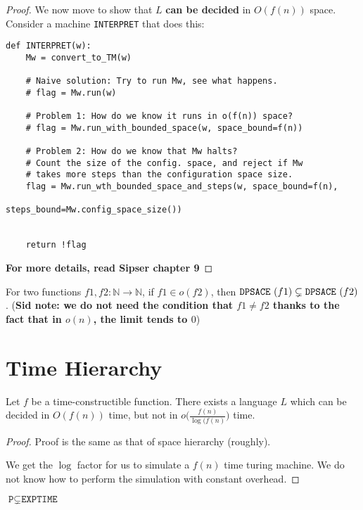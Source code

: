 \begin{proof}
We now move to show that $L$ \textbf{can be decided} in $O(f(n))$ space.
Consider a machine \texttt{INTERPRET} that does this:

\begin{verbatim}
def INTERPRET(w):
    Mw = convert_to_TM(w)

    # Naive solution: Try to run Mw, see what happens.
    # flag = Mw.run(w)

    # Problem 1: How do we know it runs in o(f(n)) space?
    # flag = Mw.run_with_bounded_space(w, space_bound=f(n))

    # Problem 2: How do we know that Mw halts?
    # Count the size of the config. space, and reject if Mw
    # takes more steps than the configuration space size.
    flag = Mw.run_wth_bounded_space_and_steps(w, space_bound=f(n), 
                                                 steps_bound=Mw.config_space_size())


    return !flag
\end{verbatim}
\textbf{For more details, read Sipser chapter 9}
\end{proof}



\begin{corollary}
For two functions $f1, f2 : \mathbb{N} \to \mathbb{N}$, if
$f1 \in o(f2)$, then $\texttt{DPSACE}~(f1) \subsetneq \texttt{DPSACE}~(f2)$. 
(\textbf{Sid note: we do not need the condition that $f1 \neq f2$ thanks to the fact
that in $o(n)$, the limit tends to $0$})
\end{corollary}

\section{Time Hierarchy}

\begin{theorem}
Let $f$ be a time-constructible function. There exists a language $L$ which
can be decided in $O(f(n))$ time, but not in $o \bigg(\frac{f(n)}{\log(f(n)} \bigg)$ time.
\end{theorem}
\begin{proof}
Proof is the same as that of space hierarchy (roughly).

We get the $\log$ factor for us to simulate a $f(n)$ time turing machine.
We do not know how to perform the simulation with constant overhead.
\end{proof}

\begin{corollary} $\texttt{P} \subsetneq \texttt{EXPTIME}$ \end{corollary}

